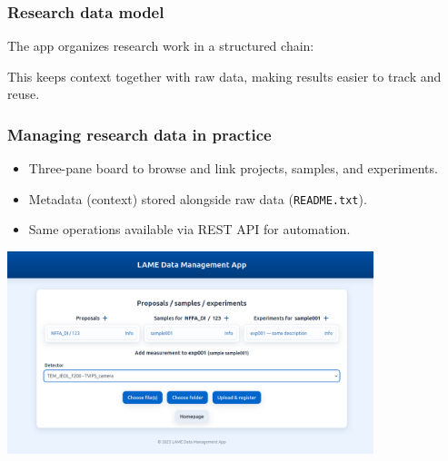 \documentclass{beamer}
\begin{document}
	\begin{frame}
		\frametitle{Research data model}
		
		The app organizes research work in a structured chain:
		
		\vspace{1em}
		\centering
		
		\vspace{1em}
		\small
		This keeps context together with raw data, making results easier to track and reuse.
	\end{frame}
	
		\begin{frame}
			\frametitle{Managing research data in practice}
			
			\begin{itemize}
				\item Three-pane board to browse and link projects, samples, and experiments.
				\item Metadata (context) stored alongside raw data (\texttt{README.txt}).
				\item Same operations available via REST API for automation.
			\end{itemize}
			
			\vspace{1em}
			\centering
			\includegraphics[width=0.8\textwidth]{otherResources/ui_add_measurement.png}
		\end{frame}
	
\end{document}
